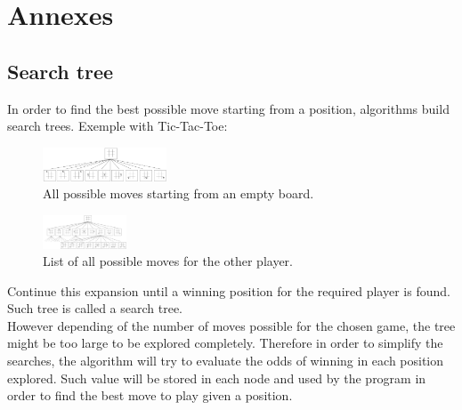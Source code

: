 \section{Annexes}
\subsection{Search tree}
In order to find the best possible move starting from a position, algorithms build search trees. 
Exemple with Tic-Tac-Toe: \cite{images_annexes}
\begin{figure}[H]
	\centering
	\includegraphics[height=1cm]{5_Annexes/img/Tree1.png}
	\caption{\label{fig:tree1}All possible moves starting from an empty board.}
\end{figure}
\noindent
\begin{figure}[H]
	\centering
	\includegraphics[height=1cm]{5_Annexes/img/Tree2.png}
	\caption{\label{fig:tree2}List of all possible moves for the other player.}
\end{figure}
\noindent
Continue this expansion until a winning position for the required player is found. Such tree is called a search tree.\\
\midskip
However depending of the number of moves possible for the chosen game, the tree might be too large to be explored completely. Therefore in order to simplify the searches, the algorithm will try to evaluate the odds of winning in each position explored. Such value will be stored in each node and used by the program in order to find the best move to play given a position.